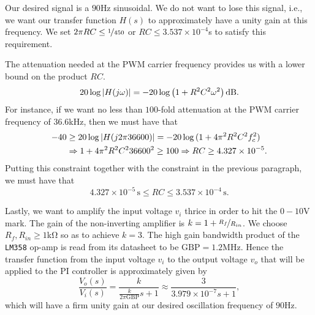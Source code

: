 Our desired signal is a $90$\unit{\hertz} sinusoidal. We do not want to lose
this signal, i.e., we want our transfer function $H(s)$ to approximately have a
unity gain at this frequency. We set $2\pi RC \leq \nicefrac{1}{450}$ or $RC
\leq 3.537 \times 10^{-4}$\unit{\second} to satisfy this requirement. 

The attenuation needed at the PWM carrier frequency provides us with a lower
bound on the product $RC$. \[ 20 \log{\abs{H(j\omega)}} = -20 \log{\left(1 +
R^2C^2\omega^2\right)}\,\unit{\decibel}. \] For instance, if we want no less
than $100$-fold attenuation at the PWM carrier frequency of
$36.6$\unit{\kilo\hertz}, then we must have that 
%
\begin{align*}
    -40 &\geq 20 \log{\left|{H(j2\pi 36600)}\right|} = -20 \log{(1+4\pi^2 R^2C^2f_c^2)} \\ 
    &\Rightarrow 1 + 4 \pi^2 R^2C^236600^2 \geq 100
    \Rightarrow RC \geq 4.327 \times 10^{-5}.
\end{align*}
%
Putting this constraint together with the constraint in the previous paragraph,
we must have that 
%
\begin{equation}
    4.327 \times 10^{-5}\,\unit{\second} \leq RC \leq 3.537 \times
    10^{-4}\,\unit{\second}.
    \label{eq:rc_req}
\end{equation}


Lastly, we want to amplify the input voltage $v_i$ thrice in order to hit the
$0-10$\unit{\volt} mark. The gain of the non-inverting amplifier is $k = 1 +
\nicefrac{R_f}{R_{in}}$. We choose $R_f, R_{in} \geq 1$\unit{\kilo\ohm} so as to
achieve $k = 3$. The high gain bandwidth product of the \texttt{LM358} op-amp is
read from its datasheet to be $\text{GBP} = 1.2$\unit{\mega\hertz}. Hence the
transfer function from the input voltage $v_i$ to the output voltage $v_o$ that
will be applied to the PI controller is approximately given by \[
    \frac{V_o(s)}{V_i(s)} = \frac{k}{\frac{k}{2\pi\text{GBP}}s + 1} \approx
\frac{3}{3.979\times 10^{-7}s + 1}, \] which will have a firm unity gain at our
desired oscillation frequency of $90$\unit{\hertz}.


